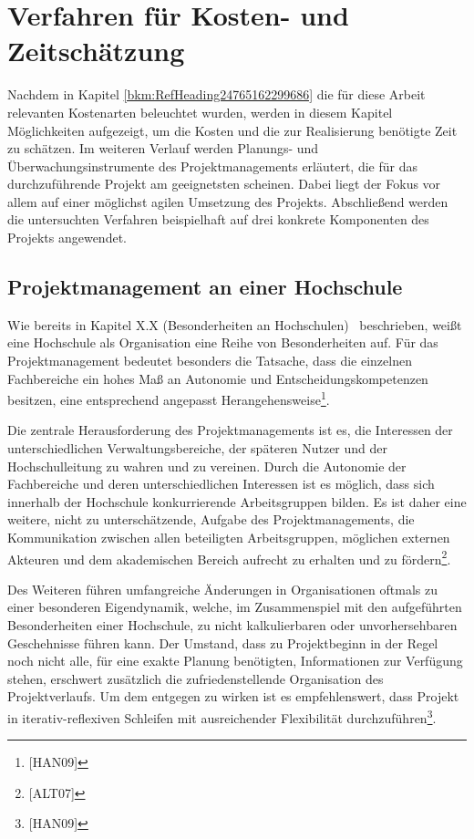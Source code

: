 \documentclass[a4paper]{article}
\begin{document}
\clearpage\section{Verfahren für Kosten- und Zeitschätzung}
{\sffamily
Nachdem in Kapitel \ref{bkm:RefHeading24765162299686} die für diese Arbeit relevanten Kostenarten beleuchtet wurden,
werden in diesem Kapitel Möglichkeiten aufgezeigt, um die Kosten und die zur Realisierung benötigte Zeit zu schätzen.
Im weiteren Verlauf werden Planungs- und Überwachungsinstrumente des Projektmanagements erläutert, die für das
durchzuführende Projekt am geeignetsten scheinen. Dabei liegt der Fokus vor allem auf einer möglichst agilen Umsetzung
des Projekts. Abschließend werden die untersuchten Verfahren beispielhaft auf drei konkrete Komponenten des Projekts
angewendet.}

\subsection{Projektmanagement an einer Hochschule}
\label{bkm:RefNumPara23461511499216}{\sffamily
Wie bereits in \textcolor[rgb]{1.0,0.2,0.2}{Kapitel X.X (Besonderheiten an Hochschulen)}\textcolor{blue}{
}\ beschrieben, weißt eine Hochschule als Organisation eine Reihe von Besonderheiten auf. Für das Projektmanagement
bedeutet besonders die Tatsache, dass die einzelnen Fachbereiche ein hohes Maß an Autonomie und
Entscheidungskompetenzen besitzen, eine entsprechend angepasst Herangehensweise\footnote{[HAN09]}.}


\bigskip

{\sffamily
Die zentrale Herausforderung des Projektmanagements ist es, die Interessen der unterschiedlichen Verwaltungsbereiche,
der späteren Nutzer und der Hochschulleitung zu wahren und zu vereinen. Durch die Autonomie der Fachbereiche und deren
unterschiedlichen Interessen ist es möglich, dass sich innerhalb der Hochschule konkurrierende Arbeitsgruppen bilden.
Es ist daher eine weitere, nicht zu unterschätzende, Aufgabe des Projektmanagements, die Kommunikation zwischen allen
beteiligten Arbeitsgruppen, möglichen externen Akteuren und dem akademischen Bereich aufrecht zu erhalten und zu
fördern\footnote{[ALT07]}.}


\bigskip

{\sffamily
Des Weiteren führen umfangreiche Änderungen in Organisationen oftmals zu einer besonderen Eigendynamik, welche, im
Zusammenspiel mit den aufgeführten Besonderheiten einer Hochschule, zu nicht kalkulierbaren oder unvorhersehbaren
Geschehnisse führen kann. Der Umstand, dass zu Projektbeginn in der Regel noch nicht alle, für eine exakte Planung
benötigten, Informationen zur Verfügung stehen, erschwert zusätzlich die zufriedenstellende Organisation des
Projektverlaufs. Um dem entgegen zu wirken ist es empfehlenswert, dass Projekt in iterativ-reflexiven Schleifen mit
ausreichender Flexibilität durchzuführen\footnote{[HAN09]}.}
\end{document}
